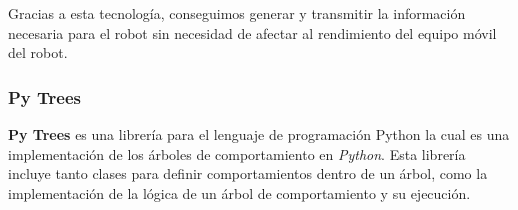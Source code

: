 \documentclass[../main.tex]{subfiles}
\begin{document}
Gracias a esta tecnología, conseguimos generar y transmitir la información necesaria para el robot sin necesidad de afectar al rendimiento del equipo móvil del robot.

\subsubsection{Py Trees}
\textbf{Py Trees} es una librería para el lenguaje de programación Python la cual es una implementación de los árboles de comportamiento en \textit{Python}. Esta librería
incluye tanto clases para definir comportamientos dentro de un árbol, como la implementación de la lógica de un árbol de comportamiento y su ejecución.
\end{document}
